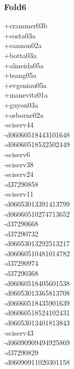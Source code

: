 \begin{multicols}{4}
\subsubsection*{Fold6}
+crammer03b\\
+costa03a\\
+cannon02a\\
+botta03a\\
+almeida05a\\
+tsang05a\\
+evgeniou05a\\
+manevitz01a\\
+guyon03a\\
+osborne02a\\
-sciserv44\\
-d06060518443101648\\
-d06060518532502449\\
-sciserv6\\
-sciserv38\\
-sciserv24\\
-d37290858\\
-sciserv11\\
-d06053013391413799\\
-d06060510274713652\\
-d37290668\\
-d37290732\\
-d06053013292513217\\
-d06060510481014782\\
-d37290974\\
-d37290368\\
-d06060518405601538\\
-d06053013365813708\\
-d06060518435901639\\
-d06060518524102431\\
-d06053013401813843\\
-sciserv43\\
-d06090909494925869\\
-d37290829\\
-d06090911020301158\\

\end{multicols}
